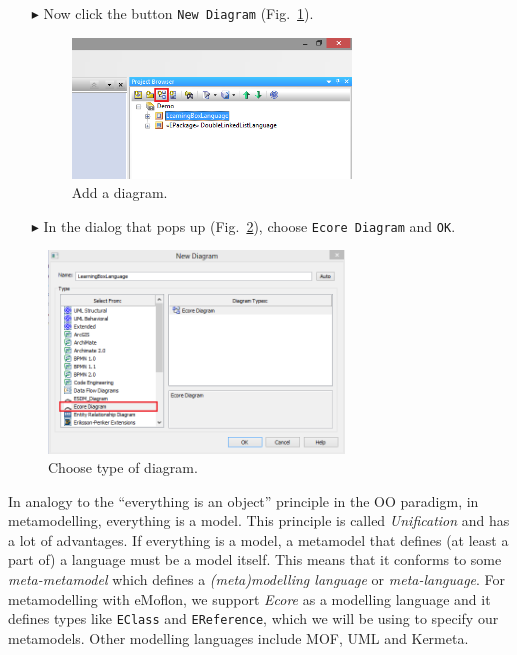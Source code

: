 \begin{enumerate}
\item[$\blacktriangleright$] Now click the button \texttt{New Diagram} (Fig.~\ref{fig:diagram}).


\begin{figure}[htbp]
	\centering
  \includegraphics[width=0.7\textwidth]{pics/memBoxBilder/memBox04.png}
	\caption{Add a diagram.}
	\label{fig:diagram}
\end{figure}
\FloatBarrier

\item[$\blacktriangleright$] In the dialog that pops up (Fig.~\ref{fig:diagram_type}), choose \texttt{Ecore Diagram} and  \texttt{OK}.
\end{enumerate}

\begin{figure}[htbp]
	\centering
  \includegraphics[width=0.7\textwidth]{pics/memBoxBilder/memBox05.png}
	\caption{Choose type of diagram.}
	\label{fig:diagram_type}
\end{figure}
\FloatBarrier

In analogy to the ``everything is an object'' principle in the OO paradigm, in metamodelling, everything is a model.
This principle is called \emph{Unification} and has a lot of advantages.
If everything is a model, a metamodel that defines (at least a part of) a language must be a model itself.
This means that it conforms to some \emph{meta-metamodel} which defines a \emph{(meta)modelling language} or \emph{meta-language}.
For metamodelling with eMoflon, we support \emph{Ecore} as a modelling language and it defines types like \texttt{EClass} and \texttt{EReference}, which we will be using to specify  our metamodels.
Other modelling languages include MOF, UML and Kermeta.

